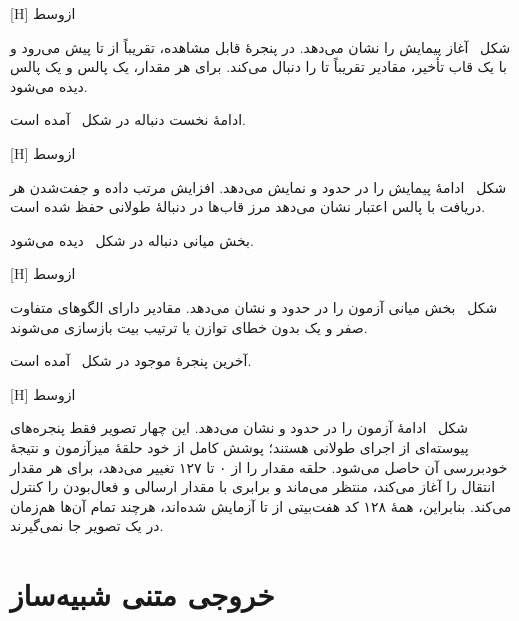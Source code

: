 [H]
‌ازوسط

شکل~ آغاز پیمایش را نشان می‌دهد. در پنجرهٔ قابل مشاهده،
 تقریباً از  تا  پیش می‌رود و  با
یک قاب تأخیر، مقادیر تقریباً  تا  را دنبال می‌کند. برای هر مقدار، یک
پالس  و یک پالس  دیده می‌شود.

ادامهٔ نخست دنباله در شکل~ آمده است.

[H]
‌ازوسط

شکل~ ادامهٔ پیمایش را در حدود
 و  نمایش می‌دهد. افزایش مرتب
داده و جفت‌شدن هر دریافت با پالس اعتبار نشان می‌دهد مرز قاب‌ها در دنبالهٔ طولانی حفظ شده
است.

بخش میانی دنباله در شکل~ دیده می‌شود.

[H]
‌ازوسط

شکل~ بخش میانی آزمون را در حدود
 و  نشان می‌دهد. مقادیر دارای
الگوهای متفاوت صفر و یک بدون خطای توازن یا ترتیب بیت بازسازی می‌شوند.

آخرین پنجرهٔ موجود در شکل~ آمده است.

[H]
‌ازوسط

شکل~ ادامهٔ آزمون را در حدود
 و  نشان می‌دهد. این چهار تصویر
فقط پنجره‌های پیوسته‌ای از اجرای طولانی هستند؛ پوشش کامل از خود حلقهٔ میزآزمون و نتیجهٔ
خودبررسی آن حاصل می‌شود. حلقه مقدار  را از ۰ تا ۱۲۷ تغییر می‌دهد، برای هر مقدار
انتقال را آغاز می‌کند، منتظر  می‌ماند و برابری  با
مقدار ارسالی و فعال‌بودن  را کنترل می‌کند. بنابراین، همهٔ ۱۲۸ کد
هفت‌بیتی از  تا  آزمایش شده‌اند، هرچند تمام آن‌ها هم‌زمان در یک تصویر
جا نمی‌گیرند.


\section{خروجی متنی شبیه‌ساز}

